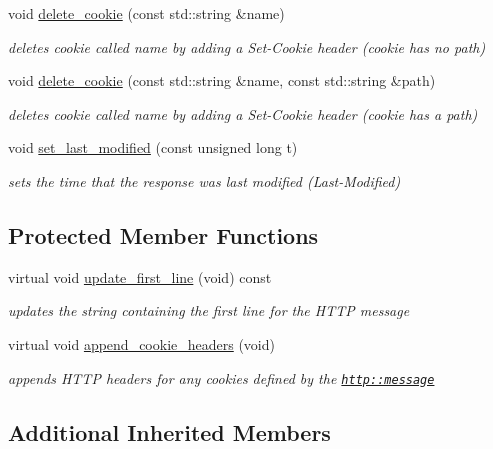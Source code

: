 \begin{DoxyCompactItemize}
void \hyperlink{classpion_1_1http_1_1response_a966ca40fe93496d7eae90b4d6c1afe69}{delete\-\_\-cookie} (const std\-::string \&name)
\begin{DoxyCompactList}\small\item\em deletes cookie called name by adding a Set-\/\-Cookie header (cookie has no path) \end{DoxyCompactList}\item 
void \hyperlink{classpion_1_1http_1_1response_a3886a2d0fc05db863dd23c3269b509eb}{delete\-\_\-cookie} (const std\-::string \&name, const std\-::string \&path)
\begin{DoxyCompactList}\small\item\em deletes cookie called name by adding a Set-\/\-Cookie header (cookie has a path) \end{DoxyCompactList}\item 
void \hyperlink{classpion_1_1http_1_1response_a224bbb594892c7a04ada36afa0dc1d1e}{set\-\_\-last\-\_\-modified} (const unsigned long t)
\begin{DoxyCompactList}\small\item\em sets the time that the response was last modified (Last-\/\-Modified) \end{DoxyCompactList}\end{DoxyCompactItemize}
\subsection*{Protected Member Functions}
\begin{DoxyCompactItemize}
\item 
virtual void \hyperlink{classpion_1_1http_1_1response_a2777a77848e97f3ea205ccfaaa06c0bf}{update\-\_\-first\-\_\-line} (void) const 
\begin{DoxyCompactList}\small\item\em updates the string containing the first line for the H\-T\-T\-P message \end{DoxyCompactList}\item 
virtual void \hyperlink{classpion_1_1http_1_1response_ad86616700baf2ba068268b3fd725d5f8}{append\-\_\-cookie\-\_\-headers} (void)
\begin{DoxyCompactList}\small\item\em appends H\-T\-T\-P headers for any cookies defined by the \href{http::message}{\tt http\-::message} \end{DoxyCompactList}\end{DoxyCompactItemize}
\subsection*{Additional Inherited Members}


